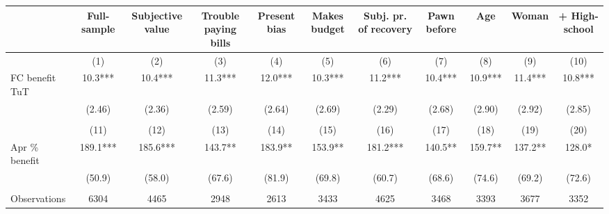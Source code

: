 \begin{tabular}{lcccccccccc}
\toprule
      & Full-sample & Subjective value & Trouble paying bills & Present bias & Makes budget & Subj. pr. of recovery & Pawn before & Age   & Woman & + High-school \\
\midrule
      & (1)   & (2)   & (3)   & (4)   & (5)   & (6)   & (7)   & (8)   & (9)   & (10) \\
\midrule
\midrule
FC benefit TuT & 10.3*** & 10.4*** & 11.3*** & 12.0*** & 10.3*** & 11.2*** & 10.4*** & 10.9*** & 11.4*** & 10.8*** \\
      & (2.46) & (2.36) & (2.59) & (2.64) & (2.69) & (2.29) & (2.68) & (2.90) & (2.92) & (2.85) \\
      &       &       &       &       &       &       &       &       &       &  \\
\midrule
      & (11)  & (12)  & (13)  & (14)  & (15)  & (16)  & (17)  & (18)  & (19)  & (20) \\
\midrule
\midrule
Apr \% benefit & 189.1*** & 185.6*** & 143.7** & 183.9** & 153.9** & 181.2*** & 140.5** & 159.7** & 137.2** & 128.0* \\
      & (50.9) & (58.0) & (67.6) & (81.9) & (69.8) & (60.7) & (68.6) & (74.6) & (69.2) & (72.6) \\
      &       &       &       &       &       &       &       &       &       &  \\
\midrule
Observations & 6304  & 4465  & 2948  & 2613  & 3433  & 4625  & 3468  & 3393  & 3677  & 3352 \\
\bottomrule
\bottomrule
\end{tabular}%
